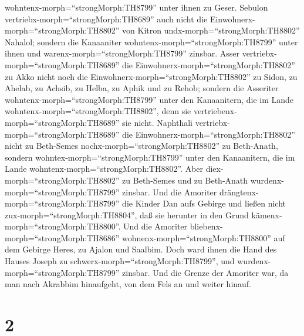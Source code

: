 wohntenx-morph=``strongMorph:TH8799'' unter ihnen zu Geser.
 Sebulon vertriebx-morph=``strongMorph:TH8689'' auch nicht
die Einwohnerx-morph=``strongMorph:TH8802'' von Kitron
undx-morph=``strongMorph:TH8802'' Nahalol; sondern die Kanaaniter
wohntenx-morph=``strongMorph:TH8799'' unter ihnen und
warenx-morph=``strongMorph:TH8799'' zinsbar.  Asser
vertriebx-morph=``strongMorph:TH8689'' die
Einwohnerx-morph=``strongMorph:TH8802'' zu Akko nicht noch die
Einwohnerx-morph=``strongMorph:TH8802'' zu Sidon, zu Ahelab, zu Achsib,
zu Helba, zu Aphik und zu Rehob;  sondern die Asseriter
wohntenx-morph=``strongMorph:TH8799'' unter den Kanaanitern, die im
Lande wohntenx-morph=``strongMorph:TH8802'', denn sie
vertriebenx-morph=``strongMorph:TH8689'' sie nicht. 
Naphthali vertriebx-morph=``strongMorph:TH8689'' die
Einwohnerx-morph=``strongMorph:TH8802'' nicht zu Beth-Semes
nochx-morph=``strongMorph:TH8802'' zu Beth-Anath, sondern
wohntex-morph=``strongMorph:TH8799'' unter den Kanaanitern, die im Lande
wohntenx-morph=``strongMorph:TH8802''. Aber
diex-morph=``strongMorph:TH8802'' zu Beth-Semes und zu Beth-Anath
wurdenx-morph=``strongMorph:TH8799'' zinsbar.  Und die
Amoriter drängtenx-morph=``strongMorph:TH8799'' die Kinder Dan aufs
Gebirge und ließen nicht zux-morph=``strongMorph:TH8804'', daß sie
herunter in den Grund kämenx-morph=``strongMorph:TH8800''. 
Und die Amoriter bliebenx-morph=``strongMorph:TH8686''
wohnenx-morph=``strongMorph:TH8800'' auf dem Gebirge Heres, zu Ajalon
und Saalbim. Doch ward ihnen die Hand des Hauses Joseph zu
schwerx-morph=``strongMorph:TH8799'', und
wurdenx-morph=``strongMorph:TH8799'' zinsbar.  Und die
Grenze der Amoriter war, da man nach Akrabbim hinaufgeht, von dem Fels
an und weiter hinauf.

\hypertarget{section-1}{%
\section{2}\label{section-1}}

